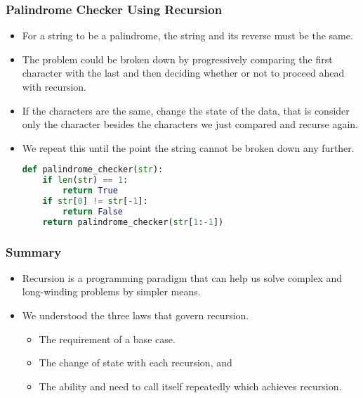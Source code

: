 \documentclass{beamer}
\begin{document}
\begin{frame}[fragile]
\frametitle{Palindrome Checker Using Recursion}
\begin{itemize}
\item For a string to be a palindrome, the string and its reverse must be the same.
\item The problem could be broken down by progressively comparing the first character with the last and then deciding whether or not to proceed ahead with recursion.
\item If the characters are the same, change the state of the data, that is consider only the character besides the characters we just compared and recurse again.
\item We repeat this until the point the string cannot be broken down any further. 
\begin{lstlisting}[language=Python]
def palindrome_checker(str):
    if len(str) == 1: 
        return True
    if str[0] != str[-1]: 
        return False
    return palindrome_checker(str[1:-1])
\end{lstlisting}
\end{itemize}
\end{frame}

\begin{frame}
\frametitle{Summary}
\begin{itemize}
\item Recursion is a programming paradigm that can help us solve  complex and long-winding problems by simpler means.
\item We understood the three laws that govern recursion.
\begin{itemize}
\item The requirement of a base case.
\item The change of state with each recursion, and
\item The ability and need to call itself repeatedly which achieves recursion.
\end{itemize} 
\end{itemize}
\end{frame}
\end{document}
